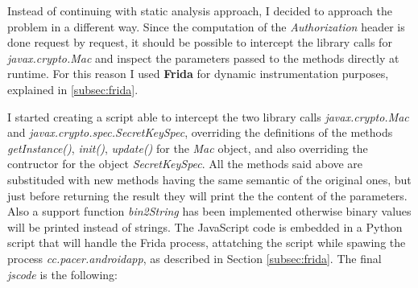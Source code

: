 			\par Instead of continuing with static analysis approach, I decided to approach the problem in a different way. Since the computation of the \textit{Authorization} header is done request by request, it should be possible to intercept the library calls for \textit{javax.crypto.Mac} and inspect the parameters passed to the methods directly at runtime. For this reason I used \textbf{Frida} for dynamic instrumentation purposes, explained in \ref{subsec:frida}.\newline
			\par I started creating a script able to intercept the two library calls \textit{javax.crypto.Mac} and \textit{javax.crypto.spec.SecretKeySpec}, overriding the definitions of the methods \textit{getInstance()}, \textit{init()}, \textit{update()} for the \textit{Mac} object, and also overriding the contructor for the object \textit{SecretKeySpec}. All the methods said above are substituded with new methods having the same semantic of the original ones, but just before returning the result they will print the the content of the parameters. Also a support function \textit{bin2String} has been implemented otherwise binary values will be printed instead of strings. The JavaScript code is embedded in a Python script that will handle the Frida process, attatching the script while spawing the process \textit{cc.pacer.androidapp}, as described in Section \ref{subsec:frida}. The final \textit{jscode} is the following:
